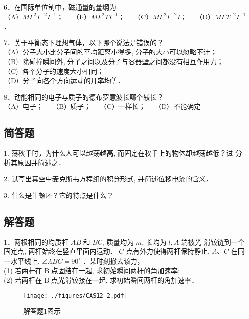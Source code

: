 6．在国际单位制中，磁通量的量纲为\\
（A）$M L^{2} T^{-2} I^{-1}$；$\quad$
（B）$M L^{2} T I^{-1}$；$\quad$
（C）$M L^{2} T^{-2} I$；$\quad$
（D）$M L T^{-2} I^{-1}$．

7．关于平衡态下理想气体，以下哪个说法是错误的？\\
（A）分子大小比分子间的平均距离小得多, 分子的大小可以忽略不计；\\
（B）除碰撞瞬间外, 分子之间以及分子与容器壁之间都没有相互作用力；\\
（C）各个分子的速度大小相同；\\
（D）分子向各个方向运动的几率均等．

8．动能相同的电子与质子的德布罗意波长哪个较长？\\
（A）电子；$\quad$
（B）质子；$\quad$
（C）一样长；$\quad$
（D）不能确定

\subsection{简答题}

1. 荡秋千时，为什么人可以越荡越高, 而固定在秋千上的物体却越荡越低？试 分析其原因并简述之．

2. 试写出真空中麦克斯韦方程组的积分形式, 并简述位移电流的含义．

3. 什么是牛顿环？它的特点是什么？
\subsection{解答题}
1．两根相同的均质杆 $A B$ 和 $B C$, 质量均为 $m$, 长均为 $l, A$ 端被光 滑铰链到一个固定点, 两杆始终在竖直平面内运动． $C$ 点有外力使得两杆保持静止, $A $、$ C$ 在同一水平线上, $\angle A B C=90^{\circ}$ ．某时刻撤去该力，\\
(1) 若两杆在 $\mathrm{B}$ 点固结在一起, 求初始瞬间两杆的角加速率;\\
(2) 若两杆在 $\mathrm{B}$ 点光滑铰接在一起, 求初始瞬间两杆的角加速率．
\begin{figure}[ht]
\centering
\texttt{[image: ./figures/CAS12\_2.pdf]}
\caption{解答题1图示} \label{CAS12_fig2}
\end{figure}


